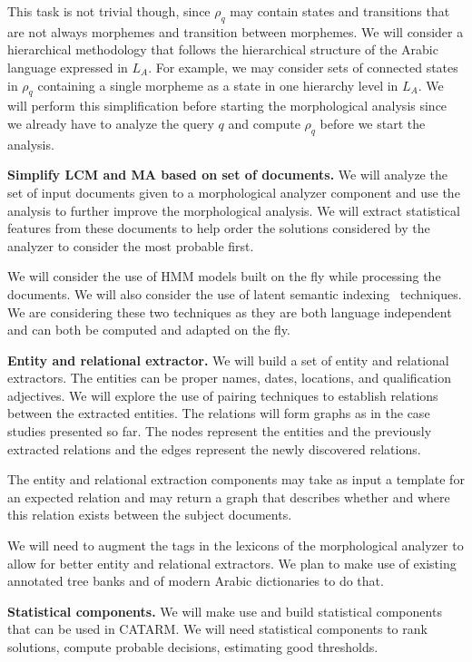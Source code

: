 \documentclass[12pt]{article}
\begin{document}
This task is not trivial though, since $\rho_q$ may contain
states and transitions that are not always morphemes and 
transition between morphemes. 
We will consider a hierarchical methodology that follows 
the hierarchical structure of the Arabic language expressed
in $L_A$. For example,
we may consider sets of connected states in $\rho_q$ 
containing a single morpheme as a state in one hierarchy level 
in $L_A$.
We will perform this simplification before starting the 
morphological analysis since we already have to analyze
the query $q$ and compute $\rho_q$ before we start
the analysis. 

{\bf Simplify LCM and MA based on set of documents.}
We will analyze the set of input documents given to a
morphological analyzer component and use the analysis
to further improve the morphological analysis. 
We will extract statistical features from these documents 
to help order the solutions considered by the analyzer
to consider the most probable first. 

We will consider the use of HMM models 
built on the fly while processing the documents.
We will also consider the use of
latent semantic indexing~\cite{LSI89} techniques. 
We are considering these two techniques as they are 
both language independent and can both be computed and
adapted on the fly.

{\bf Entity and relational extractor.}
We will build a set of entity and relational extractors. 
The entities can be proper names, dates, locations,
and qualification adjectives. 
We will explore the use of pairing techniques to establish 
relations between the extracted entities.
The relations will form graphs as in the case studies presented
so far. The nodes represent the entities and the previously 
extracted relations and the edges represent the newly discovered 
relations.

The entity and relational extraction components 
may take as input a template for an expected relation and 
may return a graph that describes whether and where 
this relation exists between the subject documents.

We will need to augment the tags in the lexicons of the 
morphological analyzer to allow for better entity and relational
extractors. 
We plan to make use of existing annotated tree banks and of
modern Arabic dictionaries to do that. 

{\bf Statistical components.}
We will make use and build statistical components that can be used
in CATARM. 
We will need statistical components to rank solutions, compute 
probable decisions, estimating good thresholds. 
\end{document}
